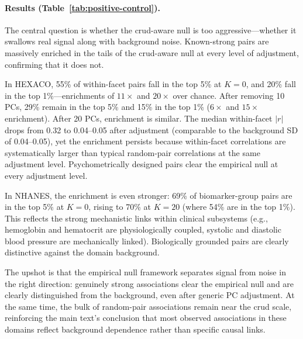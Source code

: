 \paragraph{Results (Table~\ref{tab:positive-control}).}
The central question is whether the crud-aware null is too aggressive---whether it
swallows real signal along with background noise.
Known-strong pairs are massively enriched in the tails of the crud-aware null at every
level of adjustment, confirming that it does not.

In HEXACO, 55\% of within-facet pairs fall in the top 5\% at $K{=}0$, and 20\% fall in
the top 1\%---enrichments of $11\times$ and $20\times$ over chance. After removing 10 PCs,
29\% remain in the top 5\% and 15\% in the top 1\% ($6\times$ and $15\times$ enrichment).
After 20 PCs, enrichment is similar. The median within-facet $|r|$ drops from 0.32 to
0.04--0.05 after adjustment (comparable to the background SD of 0.04--0.05), yet the
enrichment persists because within-facet correlations are systematically larger than
typical random-pair correlations at the same adjustment level.
Psychometrically designed pairs clear the empirical null at every adjustment level.

In NHANES, the enrichment is even stronger: 69\% of biomarker-group pairs are in the
top 5\% at $K{=}0$, rising to 70\% at $K{=}20$ (where 54\% are in the top 1\%). This
reflects the strong mechanistic links within clinical subsystems (e.g., hemoglobin and
hematocrit are physiologically coupled, systolic and diastolic blood pressure are
mechanically linked).
Biologically grounded pairs are clearly distinctive against the domain background.

The upshot is that the empirical null framework separates signal from noise
in the right direction: genuinely strong associations clear the empirical null and are clearly
distinguished from the background, even after generic PC adjustment.
At the same time, the bulk of random-pair associations remain near the crud scale,
reinforcing the main text's conclusion that most observed associations in these domains
reflect background dependence rather than specific causal links.

